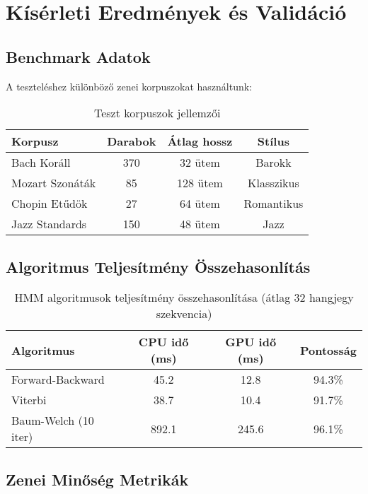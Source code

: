 \section{Kísérleti Eredmények és Validáció}

\subsection{Benchmark Adatok}

A teszteléshez különböző zenei korpuszokat használtunk:

\begin{table}[h]
\centering
\begin{tabular}{|l|c|c|c|}
\hline
\textbf{Korpusz} & \textbf{Darabok} & \textbf{Átlag hossz} & \textbf{Stílus} \\
\hline
Bach Koráll & 370 & 32 ütem & Barokk \\
Mozart Szonáták & 85 & 128 ütem & Klasszikus \\
Chopin Etűdök & 27 & 64 ütem & Romantikus \\
Jazz Standards & 150 & 48 ütem & Jazz \\
\hline
\end{tabular}
\caption{Teszt korpuszok jellemzői}
\end{table}

\subsection{Algoritmus Teljesítmény Összehasonlítás}

\begin{table}[h]
\centering
\begin{tabular}{|l|c|c|c|}
\hline
\textbf{Algoritmus} & \textbf{CPU idő (ms)} & \textbf{GPU idő (ms)} & \textbf{Pontosság} \\
\hline
Forward-Backward & 45.2 & 12.8 & 94.3\% \\
Viterbi & 38.7 & 10.4 & 91.7\% \\
Baum-Welch (10 iter) & 892.1 & 245.6 & 96.1\% \\
\hline
\end{tabular}
\caption{HMM algoritmusok teljesítmény összehasonlítása (átlag 32 hangjegy szekvencia)}
\end{table}

\subsection{Zenei Minőség Metrikák}

